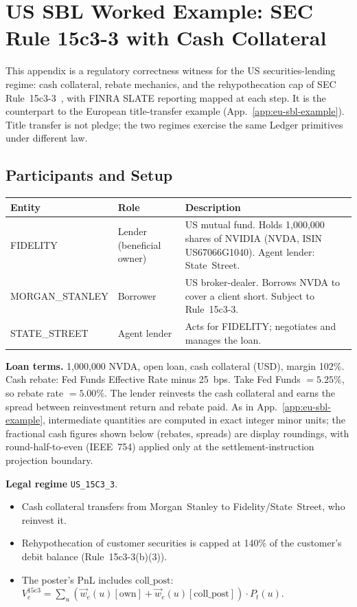 \documentclass[11pt,a4paper]{article}
\begin{document}
\section{US SBL Worked Example: SEC Rule 15c3-3 with Cash Collateral}
\label{app:us-sbl-example}

This appendix is a regulatory correctness witness for the US securities-lending regime: cash collateral, rebate mechanics, and the rehypothecation cap of SEC Rule~15c3-3~\cite{sec15c33}, with FINRA SLATE reporting mapped at each step. It is the counterpart to the European title-transfer example (App.~\ref{app:eu-sbl-example}). Title transfer is not pledge; the two regimes exercise the same Ledger primitives under different law.

\subsection{Participants and Setup}

\begin{center}\small
\begin{tabular}{l l p{7.5cm}}
\toprule
\textbf{Entity} & \textbf{Role} & \textbf{Description} \\
\midrule
FIDELITY & Lender (beneficial owner) & US mutual fund. Holds 1{,}000{,}000 shares of NVIDIA (NVDA, ISIN US67066G1040). Agent lender: State~Street. \\
MORGAN\_STANLEY & Borrower & US broker-dealer. Borrows NVDA to cover a client short. Subject to Rule~15c3-3. \\
STATE\_STREET & Agent lender & Acts for FIDELITY; negotiates and manages the loan. \\
\bottomrule
\end{tabular}
\end{center}

\noindent\textbf{Loan terms.} 1{,}000{,}000 NVDA, open loan, cash collateral (USD), margin 102\%. Cash rebate: Fed Funds Effective Rate minus 25~bps. Take Fed Funds $= 5.25\%$, so rebate rate $= 5.00\%$. The lender reinvests the cash collateral and earns the spread between reinvestment return and rebate paid. As in App.~\ref{app:eu-sbl-example}, intermediate quantities are computed in exact integer minor units; the fractional cash figures shown below (rebates, spreads) are display roundings, with round-half-to-even (IEEE~754) applied only at the settlement-instruction projection boundary.

\medskip
\noindent\textbf{Legal regime} \texttt{US\_15C3\_3}.
\begin{itemize}[nosep]
\item Cash collateral transfers from Morgan~Stanley to Fidelity/State~Street, who reinvest it.
\item Rehypothecation of customer securities is capped at 140\% of the customer's debit balance (Rule~15c3-3(b)(3)).
\item The poster's PnL includes $\mathrm{coll\_post}$: $V_e^{\mathrm{15c3}} = \sum_u (\vec{w}_e(u)[\mathrm{own}] + \vec{w}_e(u)[\mathrm{coll\_post}]) \cdot P_t(u)$.
\end{itemize}
\end{document}
